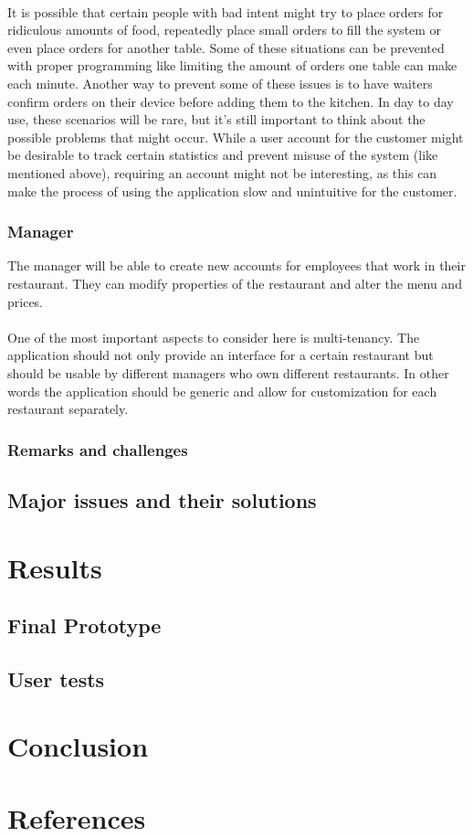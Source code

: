 \documentclass[12pt]{article}
\begin{document}
\noindent \\It is possible that certain people with bad intent might try to place orders for ridiculous amounts of food, repeatedly place small orders to fill the system or even place orders for another table. Some of these situations can be prevented with proper programming like limiting the amount of orders one table can make each minute. Another way to prevent some of these issues is to have waiters confirm orders on their device before adding them to the kitchen. In day to day use, these scenarios will be rare, but it’s still important to think about the possible problems that might occur. 
While a user account for the customer might be desirable to track certain statistics and prevent misuse of the system (like mentioned above), requiring an account might not be interesting, as this can make the process of using the application slow and unintuitive for the customer.


\subsubsection{Manager}
The manager will be able to create new accounts for employees that work in their restaurant. They can modify properties of the restaurant and alter the menu and prices. 
\\\\
One of the most important aspects to consider here is multi-tenancy. The application should not only provide an interface for a certain restaurant but should be usable by different managers who own different restaurants. In other words the application should be generic and allow for customization for each restaurant separately.
\subsubsection{Remarks and challenges}
\subsection{Major issues and their solutions}

\section{Results}
\subsection{Final Prototype}
\subsection{User tests}

\section{Conclusion}


\newpage
\section{References}


\end{document}
